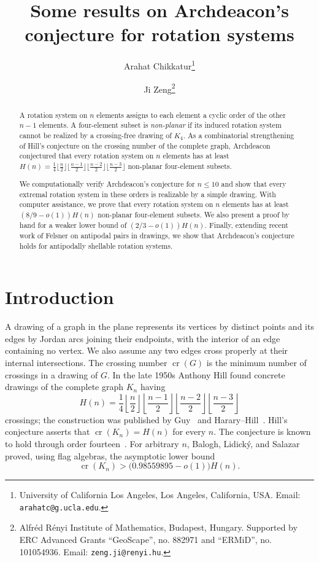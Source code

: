 \documentclass{article}
\title{Some results on Archdeacon's conjecture for rotation systems}
\author{Arahat Chikkatur\thanks{University of California Los Angeles, Los Angeles, California, USA. Email: {\tt arahatc@g.ucla.edu}.} \and Ji Zeng\thanks{Alfréd Rényi Institute of Mathematics, Budapest, Hungary. Supported by ERC Advanced Grants ``GeoScape'', no. 882971 and ``ERMiD'', no. 101054936. Email: {\tt zeng.ji@renyi.hu}.}}
\date{}
\theoremstyle{plain}
\theoremstyle{definition}
\theoremstyle{remark}
\begin{document}
\maketitle

\begin{abstract}
A rotation system on \(n\) elements assigns to each element a cyclic
order of the other \(n-1\) elements.  A four-element subset is
\emph{non-planar} if its induced rotation system cannot be realized by a
crossing-free drawing of \(K_4\). As a combinatorial strengthening
of Hill's conjecture on the crossing number of the complete graph, Archdeacon conjectured that every
rotation system on \(n\) elements has at least $H(n)=\frac{1}{4} \lfloor\frac {n}{2}\rfloor \lfloor\frac{n-1}{2}\rfloor \lfloor\frac{n-2}{2}\rfloor \lfloor\frac{n-3}{2}\rfloor$
non-planar four-element subsets.

We computationally verify Archdeacon's conjecture for $n\leq 10$ and
show that every extremal rotation system in these orders is realizable
by a simple drawing. With computer assistance, we prove that every rotation system on $n$
elements has at least $(8/9 - o(1)) H(n)$ non-planar four-element subsets.
We also present a proof by hand for a weaker lower bound of $(2/3-o(1)) H(n)$. Finally, extending recent work of
Felsner on antipodal pairs in drawings, we show that Archdeacon's conjecture holds for antipodally shellable rotation systems.
\end{abstract}

\section{Introduction}

A drawing of a graph in the plane represents its vertices by distinct
points and its edges by Jordan arcs joining their endpoints, with the
interior of an edge containing no vertex. We also assume any two edges cross properly at their internal intersections.
The crossing number \(\operatorname{cr}(G)\) is the minimum number of
crossings in a drawing of \(G\).  In the late 1950s Anthony Hill found
concrete drawings of the complete graph \(K_n\) having
\begin{equation}\label{eq:hill-number}
H(n)=\frac14
\left\lfloor\frac n2\right\rfloor
\left\lfloor\frac{n-1}2\right\rfloor
\left\lfloor\frac{n-2}2\right\rfloor
\left\lfloor\frac{n-3}2\right\rfloor
\end{equation}
crossings; the construction was published by Guy~\cite{Guy1960} and Harary--Hill~\cite{HararyHill1963}. Hill's conjecture asserts that $\operatorname{cr}(K_n)=H(n)$ for every \(n\). The conjecture is known to hold through order fourteen~\cite{Aichholzer2021}. For
arbitrary \(n\), Balogh, Lidick\'y, and Salazar~\cite{BaloghLidickySalazar2019} proved, using flag algebras, the asymptotic
lower bound
\[
\operatorname{cr}(K_n)>
  \bigl(0.98559895-o(1)\bigr)H(n).
\]
\end{document}
